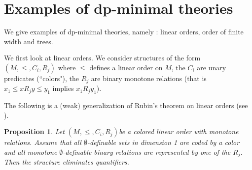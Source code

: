 \documentclass[english]{article}
\newtheorem{prop}[thm]{Proposition}
\theoremstyle{definition}
\theoremstyle{mystyle}
\theoremstyle{remark}
\begin{document}
\section{Examples of dp-minimal theories}

We give examples of dp-minimal theories, namely : linear orders, order of finite width and trees.

We first look at linear orders. We consider structures of the form $(M,\leq,C_i,R_j)$ where $\leq$ defines a linear order on $M$, the $C_i$ are unary predicates (``colors"), the $R_j$ are binary monotone relations (that is $x_1 \leq x R_j y \leq y_1$ implies $x_1 R_j y_1$).

The following is a (weak) generalization of Rubin's theorem on linear orders (see \cite{Poizat}).

\begin{prop}
Let $(M,\leq,C_i,R_j)$be a colored linear order with monotone relations. Assume that all $\emptyset$-definable sets in dimension 1 are coded by a color and all monotone $\emptyset$-definable binary relations are represented by one of the $R_j$. Then the structure eliminates quantifiers.
\end{prop}
\end{document}
